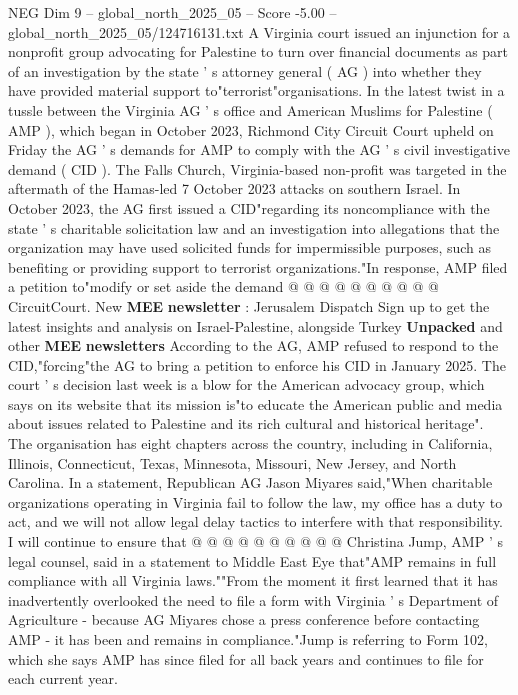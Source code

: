 \begin{textsample}{NEG Dim 9 – global\_north\_2025\_05 – Score -5.00 – global\_north\_2025\_05/124716131.txt}  \label{ex:f9_neg_095}
A Virginia court issued an injunction for a nonprofit group advocating for Palestine to turn over financial documents as part of an investigation by the state ' s attorney general ( AG ) into whether they have provided material support to"terrorist"organisations.
In the latest twist in a tussle between the Virginia AG ' s office and American Muslims for Palestine ( AMP ), which began in October 2023, Richmond City Circuit Court upheld on Friday the AG ' s demands for AMP to comply with the AG ' s civil investigative demand ( CID ).
The Falls Church, Virginia-based non-profit was targeted in the aftermath of the Hamas-led 7 October 2023 attacks on southern Israel.
In October 2023, the AG first issued a CID"regarding its noncompliance with the state ' s charitable solicitation law and an investigation into allegations that the organization may have used solicited funds for impermissible purposes, such as benefiting or providing support to terrorist organizations."In response, AMP filed a petition to"modify or set aside the demand @ @ @ @ @ @ @ @ @ @ CircuitCourt.
New \textbf{MEE} \textbf{newsletter} : Jerusalem Dispatch Sign up to get the latest insights and analysis on Israel-Palestine, alongside Turkey \textbf{Unpacked} and other \textbf{MEE} \textbf{newsletters} According to the AG, AMP refused to respond to the CID,"forcing"the AG to bring a petition to enforce his CID in January 2025.
The court ' s decision last week is a blow for the American advocacy group, which says on its website that its mission is"to educate the American public and media about issues related to Palestine and its rich cultural and historical heritage".
The organisation has eight chapters across the country, including in California, Illinois, Connecticut, Texas, Minnesota, Missouri, New Jersey, and North Carolina.
In a statement, Republican AG Jason Miyares said,"When charitable organizations operating in Virginia fail to follow the law, my office has a duty to act, and we will not allow legal delay tactics to interfere with that responsibility.
I will continue to ensure that @ @ @ @ @ @ @ @ @ @ Christina Jump, AMP ' s legal counsel, said in a statement to Middle East Eye that"AMP remains in full compliance with all Virginia laws.""From the moment it first learned that it has inadvertently overlooked the need to file a form with Virginia ' s Department of Agriculture - because AG Miyares chose a press conference before contacting AMP - it has been and remains in compliance."Jump is referring to Form 102, which she says AMP has since filed for all back years and continues to file for each current year.

\end{textsample}
